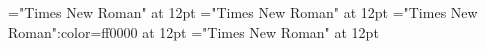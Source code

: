 \documentclass[a4paper]{article}
\begin{document}
 
\pagestyle{plain} 
\font{}="Times New Roman" at 12pt
\font\cletHeaddicBody="Times New Roman" at 12pt
\font\aletHeaddicBody="Times New Roman":color=ff0000 at 12pt
\font\bletHeaddicBody="Times New Roman" at 12pt

\pagestyle{fancy} 

\end{document}

